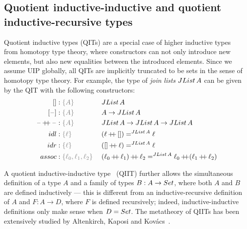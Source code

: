 \documentclass[a4paper,UKenglish,numberwithinsect,cleveref,thm-restate]{lipics-v2021}
\newcommand{\LT}[2][]{\todo[inline,author={L-T},caption={},color={pink},#1]{#2}}
\begin{document}


\subsection{Quotient inductive-inductive and quotient inductive-recursive types}

Quotient inductive types (QITs) are a special case of higher inductive types~\cite{Lumsdaine2020} from homotopy type theory, where constructors can not only introduce new elements, but also new equalities between the introduced elements.
%
Since we assume UIP globally, all QITs are implicitly truncated to be sets in the sense of homotopy type theory.
%
For example, the type of \emph{join lists} $\JList{A}$ can be given by the QIT
with the following constructors:
\begin{alignat*}{3}
  \Jnil                    & : \implicit{A}      && \JList{A} \\
  \Jsing{\blank}           & : \implicit{A}      && A \to \JList{A} \\
  \Jconcat{\blank}{\blank} & : \implicit{A}      && \JList{A} \to \JList{A} \to \JList{A} \\
  \mathsf{idl}             & : \implicit{\ell}\; && (\Jconcat{\ell}{\Jnil}) =^{\JList{A}} \ell \\
  \mathsf{idr}             & : \implicit{\ell}\; && (\Jconcat{\Jnil}{\ell}) =^{\JList{A}} \ell \\
  \mathsf{assoc}           & : \implicit{\ell_0, \ell_1, \ell_2}\; && \Jconcat{(\Jconcat{\ell_0}{\ell_1})}{\ell_2} =^{\JList{A}} \Jconcat{\ell_0}{(\Jconcat{\ell_1}{\ell_2})}
\end{alignat*}


A quotient inductive-inductive type~\cite{Altenkirch2018} (QIIT) further allows the simultaneous definition of a type $A$ and a family of types $B : A \to \Set$, where both $A$ and $B$ are defined inductively --- this is different from an inductive-recursive definition of $A$ and $F : A \to D$, where $F$ is defined recursively; indeed, inductive-inductive definitions only make sense when $D = \Set$.
The metatheory of QIITs has been extensively studied by Altenkirch, Kaposi and Kov\'acs~\cite{Kaposi2018,Kaposi2019,Kovacs2020}.
\end{document}

